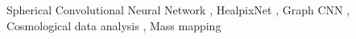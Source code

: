 \documentclass[final,twocolumn,3p,times,sort&compress]{elsarticle}
\newcommand{\nati}[1]{{\color[rgb]{.1,.6,.1}{#1}}}
\newcommand{\todo}[1]{{\color[rgb]{.6,.1,.6}{#1}}}
\newcommand{\1}{\b{1}}              %
\newcommand{\0}{\b{0}}              %
\begin{document}
\begin{frontmatter}
\begin{abstract}
\end{abstract}

\begin{keyword}
Spherical Convolutional Neural Network \sep
HealpixNet \sep
Graph CNN \sep
Cosmological data analysis \sep
Mass mapping
\end{keyword}

\end{frontmatter}

\end{document}
